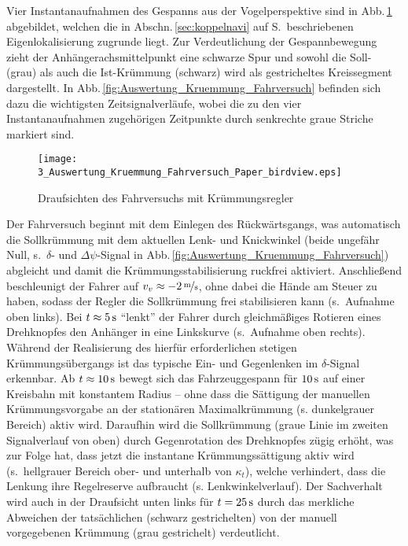 Vier Instantanaufnahmen des Gespanns aus der Vogelperspektive sind in Abb.\,\ref{fig:Auswertung_Kruemmung_Fahrversuch_draufsicht} abgebildet, welchen die in Abschn.\,\ref{sec:koppelnavi} auf S.\,\pageref{sec:koppelnavi} beschriebenen Eigenlokalisierung zugrunde liegt. Zur Verdeutlichung der Gespannbewegung zieht der Anhängerachsmittelpunkt eine schwarze Spur und sowohl die Soll- (grau) als auch die Ist-Krümmung (schwarz) wird als gestricheltes Kreissegment dargestellt. In Abb.\,\ref{fig:Auswertung_Kruemmung_Fahrversuch}  befinden sich dazu die wichtigsten Zeitsignalverläufe, wobei die zu den vier Instantanaufnahmen zugehörigen Zeitpunkte durch senkrechte graue Striche markiert sind.


%
\begin{figure}[ht]
	\centering
	
	\renewcommand{\matlabtextA}{\scriptsize}
	\texttt{[image: 3\_Auswertung\_Kruemmung\_Fahrversuch\_Paper\_birdview.eps]}		
	\def\xlabel{$t$ in \unit{s}}
    \caption[Draufsichten des Fahrversuchs mit Krümmungsregler]{Draufsichten des Fahrversuchs mit Krümmungsregler }
    \label{fig:Auswertung_Kruemmung_Fahrversuch_draufsicht}
	\end{figure}
	


Der Fahrversuch beginnt mit dem Einlegen des Rückwärtsgangs, was automatisch die Sollkrümmung mit dem aktuellen Lenk- und Knickwinkel (beide ungefähr Null, s.\ $\delta$- und $\Delta\psi$-Signal in Abb.\,\ref{fig:Auswertung_Kruemmung_Fahrversuch}) abgleicht und damit die Krümmungsstabilisierung ruckfrei aktiviert. Anschließend beschleunigt der Fahrer auf $v_v\approx \unitfrac[-2]{m}{s}$, ohne dabei die Hände am Steuer zu haben, sodass der Regler die Sollkrümmung frei stabilisieren kann (s.\ Aufnahme oben links). Bei $t\approx \unit[5]{s}$ "`lenkt"' der Fahrer durch gleichmäßiges Rotieren eines Drehknopfes den Anhänger in eine Linkskurve (s.\ Aufnahme oben rechts). Während der Realisierung des hierfür erforderlichen stetigen Krümmungsübergangs ist das typische Ein- und Gegenlenken im $\delta$-Signal erkennbar. Ab $t\approx \unit[10]{s}$ bewegt sich das Fahrzeuggespann für $\unit[10]{s}$ auf einer Kreisbahn mit konstantem Radius -- ohne dass die Sättigung der manuellen Krümmungsvorgabe an der stationären Maximalkrümmung (s. dunkelgrauer Bereich) aktiv wird. Daraufhin wird die Sollkrümmung (graue Linie im zweiten Signalverlauf von oben) durch Gegenrotation des Drehknopfes zügig erhöht, was zur Folge hat, dass jetzt die instantane Krümmungssättigung aktiv wird (s.\ hellgrauer Bereich ober- und unterhalb von $\kappa_t$), welche verhindert, dass die Lenkung ihre Regelreserve aufbraucht (s. Lenkwinkelverlauf). Der Sachverhalt wird auch in der Draufsicht unten links für $t=\unit[25]{s}$ durch das merkliche Abweichen der tatsächlichen (schwarz gestrichelten) von der manuell vorgegebenen Krümmung (grau gestrichelt) verdeutlicht.


